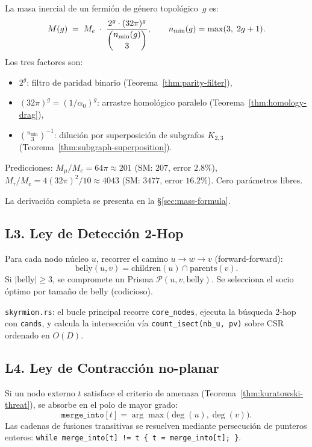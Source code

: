 \documentclass[11pt, a4paper, openany]{book}
\begin{document}
La masa inercial de un fermi\'on de g\'enero topol\'ogico~$g$ es:
\begin{equation}
  M(g) \;=\; M_e \;\cdot\;
  \frac{2^g \cdot (32\pi)^g}{\dbinom{n_{\min}(g)}{3}},
  \qquad n_{\min}(g) = \max(3,\; 2g+1).
  \label{eq:law-mass}
\end{equation}
Los tres factores son:
\begin{itemize}[nosep]
  \item $2^g$: filtro de paridad binario
        (Teorema~\ref{thm:parity-filter}),
  \item $(32\pi)^g = (1/\alpha_0)^g$: arrastre homol\'ogico paralelo
        (Teorema~\ref{thm:homology-drag}),
  \item $\binom{n_{\min}}{3}^{-1}$: diluci\'on por superposici\'on de
        subgrafos $K_{2,3}$ (Teorema~\ref{thm:subgraph-superposition}).
\end{itemize}
Predicciones: $M_\mu/M_e = 64\pi \approx 201$ (SM: $207$, error
$2{.}8\%$), $M_\tau/M_e = 4(32\pi)^2/10 \approx 4043$ (SM: $3477$,
error $16{.}2\%$). Cero par\'ametros libres.

La derivaci\'on completa se presenta en la
\S\ref{sec:mass-formula}.

\subsection*{L3. Ley de Detecci\'on 2-Hop}
\label{law:2hop-detection}

Para cada nodo n\'ucleo $u$, recorrer el camino $u \to w \to v$
(forward-forward):
\[
  \text{belly}(u,v) = \text{children}(u) \cap \text{parents}(v).
\]
Si $|\text{belly}| \geq 3$, se compromete un Prisma
$\mathcal{P}(u, v, \text{belly})$. Se selecciona el socio
\'optimo por tama\~no de belly (codicioso).

\medskip\noindent
\texttt{skyrmion.rs}: el bucle principal recorre
\texttt{core\_nodes}, ejecuta la b\'usqueda 2-hop con
\texttt{cands}, y calcula la intersecci\'on v\'ia
\texttt{count\_isect(nb\_u, pv)} sobre CSR ordenado en $O(D)$.

\subsection*{L4. Ley de Contracci\'on no-planar}
\label{law:k5-contraction}

Si un nodo externo $t$ satisface el criterio de amenaza
(Teorema~\ref{thm:kuratowski-threat}), se absorbe en el polo de
mayor grado:
\[
  \texttt{merge\_into}[t] = \arg\max\bigl(\deg(u),\deg(v)\bigr).
\]
Las cadenas de fusiones transitivas se resuelven mediante
persecuci\'on de punteros enteros:
\texttt{while merge\_into[t] != t \{ t = merge\_into[t]; \}}.
\end{document}
